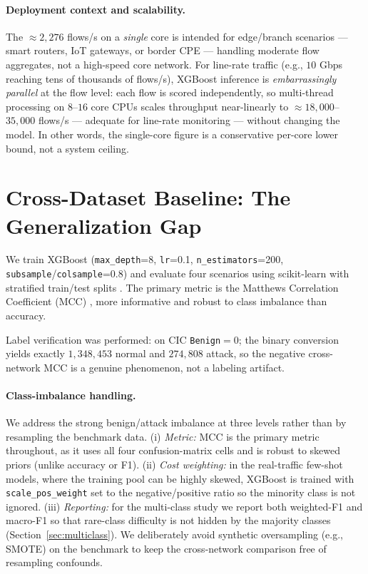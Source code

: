 \documentclass[preprint,12pt,authoryear]{elsarticle}
\begin{document}
\paragraph{Deployment context and scalability.} The $\approx 2{,}276$ flows/s on a
\emph{single} core is intended for edge/branch scenarios --- smart routers, IoT
gateways, or border CPE --- handling moderate flow aggregates, not a high-speed
core network. For line-rate traffic (e.g., $10$ Gbps reaching tens of thousands of
flows/s), XGBoost inference is \emph{embarrassingly parallel} at the flow level:
each flow is scored independently, so multi-thread processing on $8$--$16$ core
CPUs scales throughput near-linearly to $\approx 18{,}000$--$35{,}000$ flows/s ---
adequate for line-rate monitoring --- without changing the model. In other words,
the single-core figure is a conservative per-core lower bound, not a system
ceiling.

\section{Cross-Dataset Baseline: The Generalization Gap}
\label{sec:baseline}

We train XGBoost (\texttt{max\_depth}=8, \texttt{lr}=0.1,
\texttt{n\_estimators}=200, \texttt{subsample}/\texttt{colsample}=0.8) and evaluate
four scenarios using scikit-learn \citep{sklearn} with stratified train/test
splits \citep{kohavi}. The primary metric is the Matthews Correlation Coefficient
(MCC) \citep{matthews,chicco}, more informative and robust to class imbalance than
accuracy.

Label verification was performed: on CIC \texttt{Benign}$=0$; the binary
conversion yields exactly $1{,}348{,}453$ normal and $274{,}808$ attack, so the
negative cross-network MCC is a genuine phenomenon, not a labeling artifact.

\paragraph{Class-imbalance handling.} We address the strong benign/attack imbalance
at three levels rather than by resampling the benchmark data. (i) \emph{Metric:} MCC
is the primary metric throughout, as it uses all four confusion-matrix cells and is
robust to skewed priors (unlike accuracy or F1). (ii) \emph{Cost weighting:} in the
real-traffic few-shot models, where the training pool can be highly skewed, XGBoost
is trained with \texttt{scale\_pos\_weight} set to the negative/positive ratio so
the minority class is not ignored. (iii) \emph{Reporting:} for the multi-class study
we report both weighted-F1 and macro-F1 so that rare-class difficulty is not hidden
by the majority classes (Section~\ref{sec:multiclass}). We deliberately avoid
synthetic oversampling (e.g., SMOTE) on the benchmark to keep the cross-network
comparison free of resampling confounds.
\end{document}
